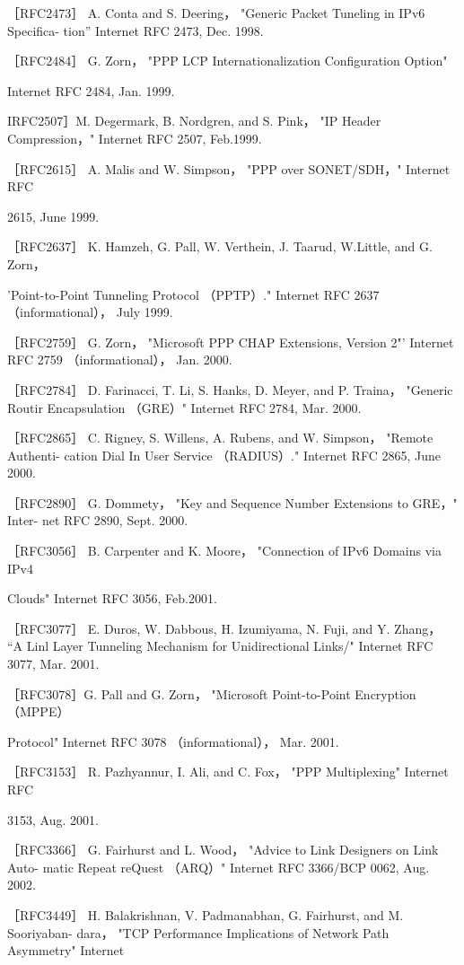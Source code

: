 ［RFC2473］ A. Conta and S. Deering， "Generic Packet Tuneling in IPv6 Specifica-
tion” Internet RFC 2473, Dec. 1998.

［RFC2484］ G. Zorn， "PPP LCP Internationalization Configuration Option"

Internet RFC 2484, Jan. 1999.

IRFC2507］M. Degermark, B. Nordgren, and S. Pink， "IP Header Compression，"
Internet RFC 2507, Feb.1999.

［RFC2615］ A. Malis and W. Simpson， "PPP over SONET/SDH，" Internet RFC

2615, June 1999.

［RFC2637］ K. Hamzeh, G. Pall, W. Verthein, J. Taarud, W.Little, and G. Zorn，

'Point-to-Point Tunneling Protocol （PPTP）." Internet RFC 2637 （informational），
July 1999.

［RFC2759］ G. Zorn， "Microsoft PPP CHAP Extensions, Version 2"' Internet RFC
2759 （informational）， Jan. 2000.

［RFC2784］ D. Farinacci, T. Li, S. Hanks, D. Meyer, and P. Traina， "Generic Routir
Encapsulation （GRE）" Internet RFC 2784, Mar. 2000.

［RFC2865］ C. Rigney, S. Willens, A. Rubens, and W. Simpson， "Remote Authenti-
cation Dial In User Service （RADIUS）." Internet RFC 2865, June 2000.

［RFC2890］ G. Dommety， "Key and Sequence Number Extensions to GRE，" Inter-
net RFC 2890, Sept. 2000.

［RFC3056］ B. Carpenter and K. Moore， "Connection of IPv6 Domains via IPv4

Clouds" Internet RFC 3056, Feb.2001.

［RFC3077］ E. Duros, W. Dabbous, H. Izumiyama, N. Fuji, and Y. Zhang， “A Linl
Layer Tunneling Mechanism for Unidirectional Links/" Internet RFC 3077, Mar.
2001.

［RFC3078］G. Pall and G. Zorn， "Microsoft Point-to-Point Encryption （MPPE）

Protocol" Internet RFC 3078 （informational）， Mar. 2001.

［RFC3153］ R. Pazhyannur, I. Ali, and C. Fox， "PPP Multiplexing" Internet RFC

3153, Aug. 2001.

［RFC3366］ G. Fairhurst and L. Wood， "Advice to Link Designers on Link Auto-
matic Repeat reQuest （ARQ）" Internet RFC 3366/BCP 0062, Aug. 2002.

［RFC3449］ H. Balakrishnan, V. Padmanabhan, G. Fairhurst, and M. Sooriyaban-
dara， "TCP Performance Implications of Network Path Asymmetry" Internet

